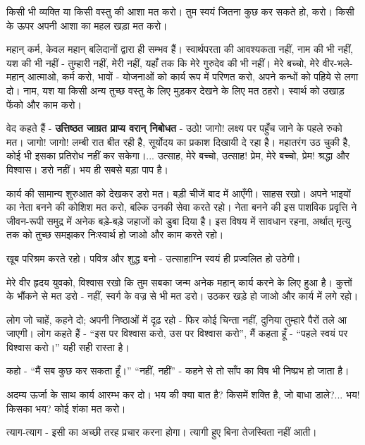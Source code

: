 किसी भी व्यक्ति या किसी वस्तु की आशा मत करो। तुम स्वयं जितना कुछ कर सकते हो, करो। किसी के ऊपर अपनी आशा का महल खड़ा मत करो। 

\newpage

महान् कर्म, केवल महान् बलिदानों द्वारा ही सम्भव हैं। स्वार्थपरता की आवश्यकता नहीं, नाम की भी नहीं, यश की भी नहीं - तुम्हारी नहीं, मेरी नहीं, यहाँ तक कि मेरे गुरुदेव की भी नहीं। मेरे बच्चो, मेरे वीर-भले-महान् आत्माओ, कर्म करो, भावों - योजनाओं को कार्य रूप में परिणत करो, अपने कन्धों को पहिये से लगा दो। नाम, यश या किसी अन्य तुच्छ वस्तु के लिए मुड़कर देखने के लिए मत ठहरो। स्वार्थ को उखाड़ फेंको और काम करो। 

वेद कहते हैं - \textbf{उत्तिष्ठत जाग्रत प्राप्य वरान् निबोधत } - उठो! जागो! लक्ष्य पर पहुँच जाने के पहले रुको मत। जागो! जागो! लम्बी रात बीत रही है, सूर्योदय का प्रकाश दिखायी दे रहा है। महातरंग उठ चुकी है, कोई भी इसका प्रतिरोध नहीं कर सकेगा।... उत्साह, मेरे बच्चो, उत्साह! प्रेम, मेरे बच्चो, प्रेम! श्रद्धा और विश्वास। डरो नहीं। भय ही सबसे बड़ा पाप है। 

कार्य की सामान्य शुरुआत को देखकर डरो मत। बड़ी चीजें बाद में आएँगी। साहस रखो। अपने भाइयों का नेता बनने की कोशिश मत करो, बल्कि उनकी सेवा करते रहो। नेता बनने की इस पाशविक प्रवृत्ति ने जीवन-रूपी समुद्र में अनेक बड़े-बड़े जहाजों को डुबा दिया है। इस विषय में सावधान रहना, अर्थात् मृत्यु तक को तुच्छ समझकर निःस्वार्थ हो जाओ और काम करते रहो। 

खूब परिश्रम करते रहो। पवित्र और शुद्ध बनो - उत्साहाग्नि स्वयं ही प्रज्वलित हो उठेगी। 

मेरे वीर हृदय युवको, विश्वास रखो कि तुम सबका जन्म अनेक महान् कार्य करने के लिए हुआ है। कुत्तों के भौंकने से मत डरो - नहीं, स्वर्ग के वज्र से भी मत डरो। उठकर खड़े हो जाओ और कार्य में लगे रहो। 

लोग जो चाहें, कहने दो; अपनी निष्ठाओं में दृढ़ रहो - फिर कोई चिन्ता नहीं, दुनिया तुम्हारे पैरों तले आ जाएगी। लोग कहते हैं - “इस पर विश्वास करो, उस पर विश्वास करो”, मैं कहता हूँ - “पहले स्वयं पर विश्वास करो।” यही सही रास्ता है। 

कहो - “मैं सब कुछ कर सकता हूँ।” “नहीं, नहीं” - कहने से तो साँप का विष भी निष्प्रभ हो जाता है। 

अदम्य ऊर्जा के साथ कार्य आरम्भ कर दो। भय की क्या बात है? किसमें शक्ति है, जो बाधा डाले?... भय! किसका भय? कोई शंका मत करो। 

त्याग-त्याग - इसी का अच्छी तरह प्रचार करना होगा। त्यागी हुए बिना तेजस्विता नहीं आती। 

